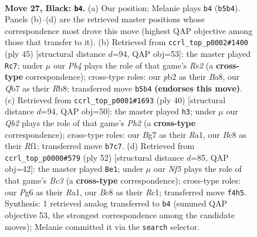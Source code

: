 \documentclass[11pt]{article}
\begin{document}
\begin{figure}[p]
\label{fig:thought-m51}
\end{figure}

\clearpage

\begin{figure}[p]\centering
\begin{subfigure}{0.46\textwidth}\centering
\resizebox{\linewidth}{!}{%
\newchessgame
\chessboard[
  setfen={r1b4r/1q3kbp/p1npp1p1/1p2p1P1/4PnQP/2N2P1B/PPPK1B2/R1R5 b - - 6 27},
  showmover=false,
  pgfstyle=straightmove, color=movearrow, markmove={b5-b4}
]}
\caption{}
\end{subfigure}\hfill
\begin{subfigure}{0.46\textwidth}\centering
\resizebox{\linewidth}{!}{%
\newchessgame
\chessboard[
  setfen={br4k1/p3rpp1/1p1bqn1p/1Bpp4/3P4/1P2PQP1/PBRN1PP1/2R3K1 b - - 10 23},
  showmover=false,
  pgfstyle=straightmove, color=movearrow, markmove={e7-c7}
]}
\caption{}
\end{subfigure}
\\[4pt]
\begin{subfigure}{0.46\textwidth}\centering
\resizebox{\linewidth}{!}{%
\newchessgame
\chessboard[
  setfen={2br1rk1/1p2bpp1/1qp1p2p/p2n4/P1BPN3/2P2P2/1P1Q2PP/R4RBK w - - 0 21},
  showmover=false,
  pgfstyle=straightmove, color=movearrow, markmove={h2-h3}
]}
\caption{}
\end{subfigure}\hfill
\begin{subfigure}{0.46\textwidth}\centering
\resizebox{\linewidth}{!}{%
\newchessgame
\chessboard[
  setfen={r2r1nk1/2p1qpp1/2b1p2p/ppN1P3/1n2PP1P/1PB1Q1PK/6B1/R1R5 w - - 9 27},
  showmover=false,
  pgfstyle=straightmove, color=movearrow, markmove={c3-e1}
]}
\caption{}
\end{subfigure}
\caption{\textbf{Move 27, Black: \texttt{b4}.} (a) Our position; Melanie plays \texttt{b4} (\texttt{b5b4}). Panels (b)--(d) are the retrieved master positions whose correspondence most drove this move (highest QAP objective among those that transfer to it). (b) Retrieved from \texttt{ccrl\_top\_p0002\#1400} (ply 45) [structural distance $d$=94, QAP obj=53]: the master played \texttt{Rc7}; under $\mu$ our \emph{Pb4} plays the role of that game's \emph{Re2} (a \textbf{cross-type} correspondence); cross-type roles: our \emph{p}b2 as their \emph{B}a8, our \emph{Q}b7 as their \emph{R}b8; transferred move \texttt{b5b4} \textbf{(endorses this move)}. (c) Retrieved from \texttt{ccrl\_top\_p0001\#1693} (ply 40) [structural distance $d$=94, QAP obj=50]: the master played \texttt{h3}; under $\mu$ our \emph{Qb2} plays the role of that game's \emph{Ph2} (a \textbf{cross-type} correspondence); cross-type roles: our \emph{B}g7 as their \emph{R}a1, our \emph{B}c8 as their \emph{R}f1; transferred move \texttt{b7c7}. (d) Retrieved from \texttt{ccrl\_top\_p0000\#579} (ply 52) [structural distance $d$=85, QAP obj=42]: the master played \texttt{Be1}; under $\mu$ our \emph{Nf5} plays the role of that game's \emph{Bc3} (a \textbf{cross-type} correspondence); cross-type roles: our \emph{P}g6 as their \emph{R}a1, our \emph{B}c8 as their \emph{R}c1; transferred move \texttt{f4h5}. Synthesis: 1 retrieved analog transferred to \texttt{b4} (summed QAP objective 53, the strongest correspondence among the candidate moves); Melanie committed it via the \texttt{search} selector.}

\end{figure}
\end{document}
